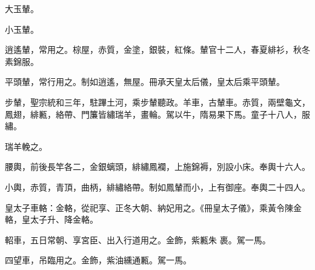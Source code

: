 \begin{pinyinscope}
 大玉輦。



 小玉輦。



 逍遙輦，常用之。棕屋，赤質，金塗，銀裝，紅條。輦官十二人，春夏緋衫，秋冬素錦服。



 平頭輦，常行用之。制如逍遙，無屋。冊承天皇太后儀，皇太后乘平頭輦。



 步輦，聖宗統和三年，駐蹕土河，乘步輦聽政。羊車，古輦車。赤質，兩壁龜文，鳳翅，緋甉，絡帶、門簾皆繡瑞羊，畫輪。駕以牛，隋易果下馬。童子十八人，服
 繡。



 瑞羊輓之。



 腰輿，前後長竿各二，金銀螭頭，緋繡鳳襴，上施錦褥，別設小床。奉輿十六人。



 小輿，赤質，青頂，曲柄，緋繡絡帶。制如鳳輦而小，上有御座。奉輿二十四人。



 皇太子車輅：金輅，從祀享、正冬大朝、納妃用之。《冊皇太子儀》，乘黃令陳金輅，皇太子升、降金輅。



 軺車，五日常朝、享宮臣、出入行道用之。金飾，紫甉朱
 裹。駕一馬。



 四望車，吊臨用之。金飾，紫油纁通甉。駕一馬。



\end{pinyinscope}